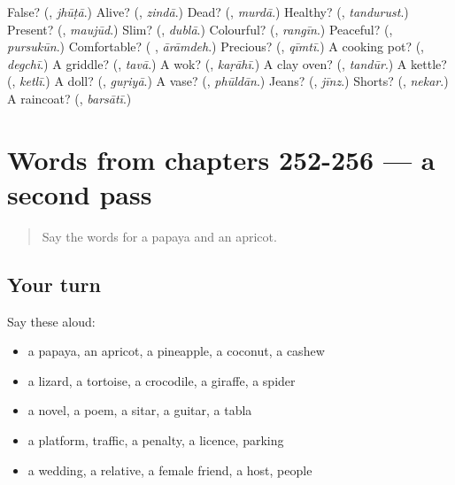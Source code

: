 \begin{tcolorbox}[breakable,colback=teal!4,colframe=teal!35!black,title={Before you move on}]
False? (\textbf{}, \emph{jhūṭā}.) Alive? (\textbf{}, \emph{zindā}.) Dead? (\textbf{}, \emph{murdā}.) Healthy? (\textbf{}, \emph{tandurust}.) Present? (\textbf{}, \emph{maujūd}.) Slim? (\textbf{}, \emph{dublā}.) Colourful? (\textbf{}, \emph{rangīn}.) Peaceful? (\textbf{}, \emph{pursukūn}.) Comfortable? (\textbf{ }, \emph{ārāmdeh}.) Precious? (\textbf{}, \emph{qīmtī}.) A cooking pot? (\textbf{}, \emph{degchī}.) A griddle? (\textbf{}, \emph{tavā}.) A wok? (\textbf{}, \emph{kaṛāhī}.) A clay oven? (\textbf{}, \emph{tandūr}.) A kettle? (\textbf{}, \emph{ketlī}.) A doll? (\textbf{}, \emph{guṛiyā}.) A vase? (\textbf{}, \emph{phūldān}.) Jeans? (\textbf{}, \emph{jīnz}.) Shorts? (\textbf{}, \emph{nekar}.) A raincoat? (\textbf{}, \emph{barsātī}.)
\end{tcolorbox}
\section[(dialogue)]{Words from chapters 252-256 — a second pass}

\label{lesson:UR-R256-second-pass-words-from-chapters-252-256}



\begin{quote}
Say the words for a papaya and an apricot.
\end{quote}

\subsection*{Your turn}
Say these aloud:

\begin{itemize}
\raggedright
  \item a papaya, an apricot, a pineapple, a coconut, a cashew
  \item a lizard, a tortoise, a crocodile, a giraffe, a spider
  \item a novel, a poem, a sitar, a guitar, a tabla
  \item a platform, traffic, a penalty, a licence, parking
  \item a wedding, a relative, a female friend, a host, people
\end{itemize}

